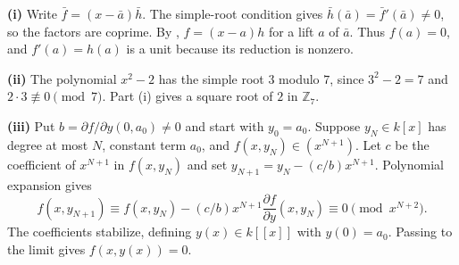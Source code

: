 \textbf{(i)} Write $\bar f=(x-\bar a)\bar h$. The simple-root condition gives $\bar h(\bar a)=\bar f'(\bar a)\ne0$, so the factors are coprime. By , $f=(x-a)h$ for a lift $a$ of $\bar a$. Thus $f(a)=0$, and $f'(a)=h(a)$ is a unit because its reduction is nonzero.

\textbf{(ii)} The polynomial $x^2-2$ has the simple root $3$ modulo $7$, since $3^2-2=7$ and $2\cdot3\not\equiv0\pmod7$. Part (i) gives a square root of $2$ in $\mathbb{Z}_7$.

\textbf{(iii)} Put $b=\partial f/\partial y(0,a_0)\ne0$ and start with $y_0=a_0$. Suppose $y_N\in k[x]$ has degree at most $N$, constant term $a_0$, and $f(x,y_N)\in(x^{N+1})$. Let $c$ be the coefficient of $x^{N+1}$ in $f(x,y_N)$ and set $y_{N+1}=y_N-(c/b)x^{N+1}$. Polynomial expansion gives
\[f(x,y_{N+1})\equiv f(x,y_N)-(c/b)x^{N+1}\frac{\partial f}{\partial y}(x,y_N)\equiv0\pmod{x^{N+2}}.\]
The coefficients stabilize, defining $y(x)\in k[[x]]$ with $y(0)=a_0$. Passing to the limit gives $f(x,y(x))=0$.
